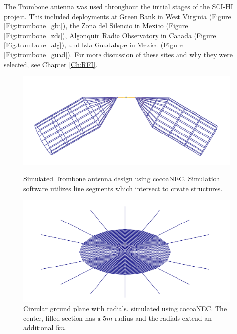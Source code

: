 The Trombone antenna was used throughout the initial stages of the SCI-HI project. This included deployments at Green Bank in West Virginia (Figure \ref{Fig:trombone_gbt}), the Zona del Silencio in Mexico (Figure \ref{Fig:trombone_zds}), Algonquin Radio Observatory in Canada (Figure \ref{Fig:trombone_alg}), and Isla Guadalupe in Mexico (Figure \ref{Fig:trombone_guad}). For more discussion of these sites and why they were selected, see Chapter \ref{Ch:RFI}.

\begin{figure}[htb]
\centering
\begin{minipage}[b]{0.56\textwidth}
\centering
\includegraphics[width=0.95\linewidth]{SCIHI_system/figures/trombone_sim.png}
\caption{Simulated Trombone antenna design using cocoaNEC. Simulation software utilizes line segments which intersect to create structures. }
\label{Fig:trombone_sym}
\end{minipage}%
\begin{minipage}[b]{0.02\textwidth}
\hspace{1cm}
\end{minipage}%
\begin{minipage}[b]{0.42\textwidth}
\centering
\includegraphics[width=0.95\linewidth]{SCIHI_system/figures/ground_plane_sim.png}
\caption{Circular ground plane with radials, simulated using cocoaNEC. The center, filled section has a $5 m$ radius and the radials extend an additional $5 m$.}
\label{Fig:gp_sym}
\end{minipage}
\end{figure}

